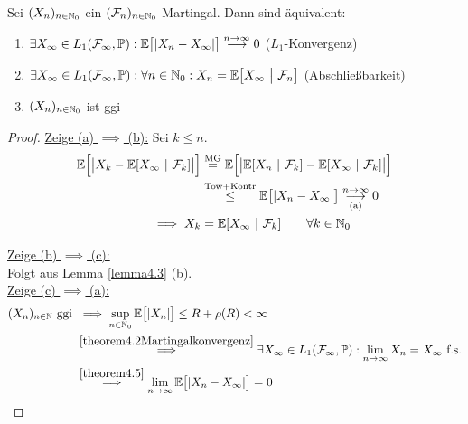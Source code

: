 \begin{theorem}\label{theorem4.6L1KonvergenzVonMartingalen}\enter
Sei $(X_n)_{n\in\mathbb{N}_0}$ ein $(\mathcal{F}_n)_{n\in\mathbb{N}_0}$-Martingal. Dann sind äquivalent:
\begin{enumerate}[label=(\alph*)]
\item $\begin{aligned}
\exists X_\infty\in L_1(\mathcal{F}_\infty,\mathbb{P}):\mathbb{E}\big[|X_n-X_\infty|\big]\stackrel{n\to\infty}{\longrightarrow}0
\end{aligned}$ ($L_1$-Konvergenz)
\item $\begin{aligned}
\exists X_\infty\in L_1(\mathcal{F}_\infty,\mathbb{P}):\forall n\in\mathbb{N}_0: X_n=\mathbb{E}\big[X_\infty~\big|~\mathcal{F}_n\big]
\end{aligned}$ (Abschließbarkeit)
\item $\begin{aligned}
(X_n)_{n\in\mathbb{N}_0}
\end{aligned}$ ist ggi
\end{enumerate}
\end{theorem}
\begin{proof}
\underline{Zeige (a) $\implies$ (b):} Sei $k\leq n$.
\begin{align*}
\mathbb{E}\Big[\big|X_k-\mathbb{E}[X_\infty~|~\mathcal{F}_k]\big|\Big]
&\stackrel{\text{MG}}{=}
\mathbb{E}\Big[\big|\mathbb{E}[X_n~|~\mathcal{F}_k]-\mathbb{E}[X_\infty~|~\mathcal{F}_k]\big|\Big]\\
&\stackrel{\text{Tow+Kontr}}{\leq}
\mathbb{E}\big[|X_n-X_\infty|\big]\underset{\text{(a)}}{\overset{n\to\infty}{\longrightarrow}}0\\
\implies X_k&=\mathbb{E}[X_\infty~|~\mathcal{F}_k]\qquad\forall k\in\mathbb{N}_0
\end{align*}

\underline{Zeige (b) $\implies$ (c):}\\
Folgt aus Lemma \ref{lemma4.3} (b).\\

\underline{Zeige (c) $\implies$ (a):}
\begin{align*}
(X_n)_{n\in\mathbb{N}}\text{ ggi }&\implies\sup\limits_{n\in\mathbb{N}_0}\mathbb{E}\big[|X_n|\big]\leq R+\rho(R)<\infty\\
&\stackrel{\ref{theorem4.2Martingalkonvergenz}}{\implies}
\exists X_\infty\in L_1(\mathcal{F}_\infty,\mathbb{P}):\lim\limits_{n\to\infty} X_n=X_\infty\text{ f.s.}\\
&\stackrel{\ref{theorem4.5}}{\implies}
\lim\limits_{n\to\infty}\mathbb{E}\big[|X_n-X_\infty|\big]=0
\end{align*}
\end{proof}
